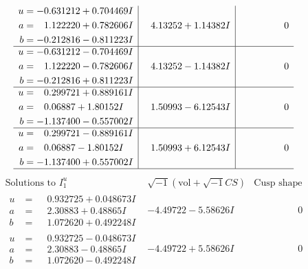 \documentclass[1p]{elsarticle_modified}
\theoremstyle{definition}
\newcommand{\I}{\sqrt{-1}}
\begin{document}
$$\begin{array}{c|c|c}
\begin{aligned}
u &= -0.631212 + 0.704469 I \\
a &= \phantom{-}1.122220 + 0.782606 I \\
b &= -0.212816 - 0.811223 I\end{aligned}
 & \phantom{-}4.13252 + 1.14382 I & \phantom{-0.000000 } 0 \\ \hline\begin{aligned}
u &= -0.631212 - 0.704469 I \\
a &= \phantom{-}1.122220 - 0.782606 I \\
b &= -0.212816 + 0.811223 I\end{aligned}
 & \phantom{-}4.13252 - 1.14382 I & \phantom{-0.000000 } 0 \\ \hline\begin{aligned}
u &= \phantom{-}0.299721 + 0.889161 I \\
a &= \phantom{-}0.06887 + 1.80152 I \\
b &= -1.137400 - 0.557002 I\end{aligned}
 & \phantom{-}1.50993 - 6.12543 I & \phantom{-0.000000 } 0 \\ \hline\begin{aligned}
u &= \phantom{-}0.299721 - 0.889161 I \\
a &= \phantom{-}0.06887 - 1.80152 I \\
b &= -1.137400 + 0.557002 I\end{aligned}
 & \phantom{-}1.50993 + 6.12543 I & \phantom{-0.000000 } 0\\
 \hline 
 \end{array}$$\newpage$$\begin{array}{c|c|c}  
\text{Solutions to }I^u_{1}& \I (\text{vol} + \sqrt{-1}CS) & \text{Cusp shape}\\
 \hline 
\begin{aligned}
u &= \phantom{-}0.932725 + 0.048673 I \\
a &= \phantom{-}2.30883 + 0.48865 I \\
b &= \phantom{-}1.072620 + 0.492248 I\end{aligned}
 & -4.49722 - 5.58626 I & \phantom{-0.000000 } 0 \\ \hline\begin{aligned}
u &= \phantom{-}0.932725 - 0.048673 I \\
a &= \phantom{-}2.30883 - 0.48865 I \\
b &= \phantom{-}1.072620 - 0.492248 I\end{aligned}
 & -4.49722 + 5.58626 I & \phantom{-0.000000 } 0 \\ \hline\begin{aligned}

\end{aligned}
\end{array}$$
\end{document}
